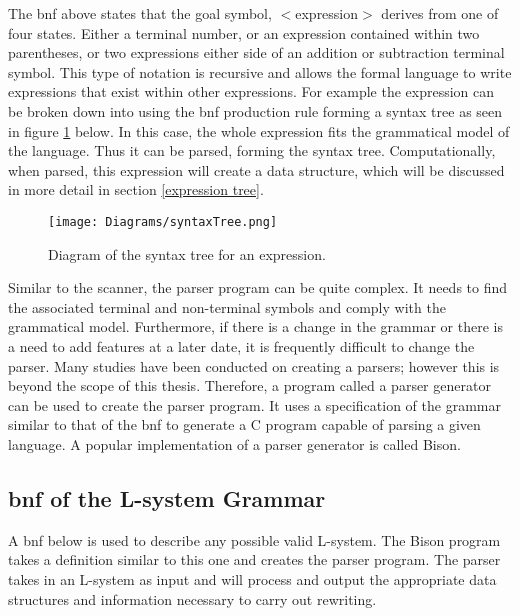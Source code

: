 \noindent
The \acrshort{bnf} above states that the goal symbol, $<$expression$>$ derives from one of four states. Either a terminal number, or an expression contained within two parentheses, or two expressions either side of an addition or subtraction terminal symbol. This type of notation is recursive and allows the formal language to write expressions that exist within other expressions. For example the expression  can be broken down into using the \acrshort{bnf} production rule forming a syntax tree as seen in figure \ref{syntax tree} below. In this case, the whole expression fits the grammatical model of the language. Thus it can be parsed, forming the syntax tree. Computationally, when parsed, this expression will create a data structure, which will be discussed in more detail in section \ref{expression tree}.

\begin{figure}[htbp]
	{\centering
		\vspace{7px}
		
		\texttt{[image: Diagrams/syntaxTree.png]}
		
		\caption{Diagram of the syntax tree for an expression.} \label{syntax tree}
	}
\end{figure}
\FloatBarrier

\noindent
Similar to the scanner, the parser program can be quite complex. It needs to find the associated terminal and non-terminal symbols and comply with the grammatical model. Furthermore, if there is a change in the grammar or there is a need to add features at a later date, it is frequently difficult to change the parser. Many studies have been conducted on creating a parsers; however this is beyond the scope of this thesis. Therefore, a program called a parser generator can be used to create the parser program. It uses a specification of the grammar similar to that of the \acrshort{bnf} to generate a C program capable of parsing a given language. A popular implementation of a parser generator is called Bison.

\subsection{\acrlong{bnf} of the L-system Grammar} \label{L-system Grammar}

A \acrshort{bnf} below is used to describe any possible valid L-system. The Bison program takes a definition similar to this one and creates the parser program. The parser takes in an L-system as input and will process and output the appropriate data structures and information necessary to carry out rewriting.

